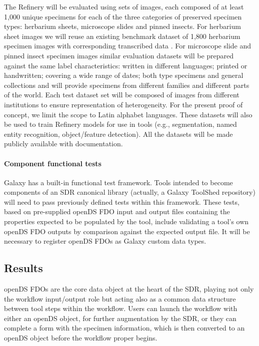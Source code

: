 The Refinery will be evaluated using sets of images, each composed of at
least 1,000 unique specimens for each of the three categories of
preserved specimen types: herbarium sheets, microscope slides and pinned
insects. For herbarium sheet images we will reuse an existing benchmark
dataset of 1,800 herbarium specimen images with corresponding
transcribed data \cite{ch8-59}. For microscope slide and pinned insect
specimen images similar evaluation datasets will be prepared against the
same label characteristics: written in different languages; printed or
handwritten; covering a wide range of dates; both type specimens and
general collections and will provide specimens from different families
and different parts of the world. Each test dataset set will be composed
of images from different institutions to ensure representation of
heterogeneity. For the present proof of concept, we limit the scope to
Latin alphabet languages. These datasets will also be used to train
Refinery models for use in tools (e.g., segmentation, named entity
recognition, object/feature detection). All the datasets will be made
publicly available with documentation.

\hypertarget{component-functional-tests}{%
\paragraph{Component functional
tests}\label{component-functional-tests}}

Galaxy has a built-in functional test framework. Tools intended to
become components of an SDR canonical library (actually, a Galaxy
ToolShed repository) will need to pass previously defined tests within
this framework. These tests, based on pre-supplied openDS FDO input and
output files containing the properties expected to be populated by the
tool, include validating a tool's own openDS FDO outputs by comparison
against the expected output file. It will be necessary to register
openDS FDOs as Galaxy custom data types.

\hypertarget{results}{%
\subsection{Results}\label{results}}

openDS FDOs are the core data object at the heart of the SDR, playing
not only the workflow input/output role but acting also as a common data
structure between tool steps within the workflow. Users can launch the
workflow with either an openDS object, for further augmentation by the
SDR, or they can complete a form with the specimen information, which is
then converted to an openDS object before the workflow proper begins.


